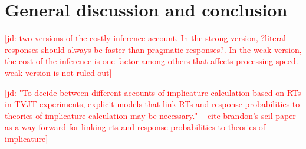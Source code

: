 \documentclass[10pt,letterpaper]{article}
\newcommand{\jd}[1]{\textcolor{Red}{[jd: #1]}}
\begin{document}


\section{General discussion and conclusion}

\jd{two versions of the costly inference account. In the strong version, ?literal responses should always be faster than pragmatic responses?. In the weak version, the cost of the inference is one factor among others that affects processing speed. weak version is not ruled out}

\jd{"To decide between different accounts of implicature calculation based on RTs in TVJT experiments, explicit models that link RTs and response probabilities to theories of implicature calculation may be necessary." -- cite brandon's scil paper as a way forward for linking rts and response probabilities to theories of implicature}
\end{document}
